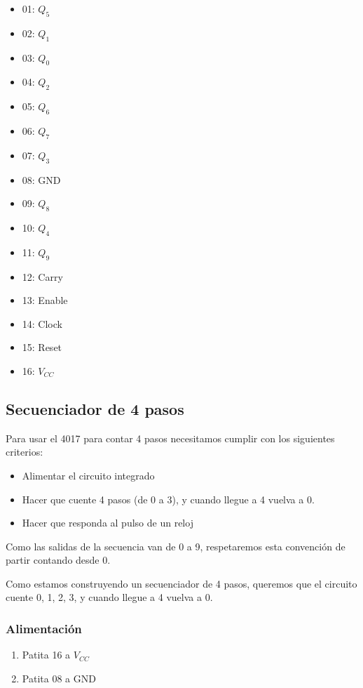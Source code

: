 \documentclass[../principal.tex]{subfiles}
\begin{document}
\begin{itemize}
    \item 01: $Q_{5}$
    \item 02: $Q_{1}$
    \item 03: $Q_{0}$
    \item 04: $Q_{2}$
    \item 05: $Q_{6}$
    \item 06: $Q_{7}$
    \item 07: $Q_{3}$
    \item 08: GND
    \item 09: $Q_{8}$
    \item 10: $Q_{4}$
    \item 11: $Q_{9}$
    \item 12: Carry
    \item 13: Enable
    \item 14: Clock
    \item 15: Reset
    \item 16: $V_{CC}$
\end{itemize}

\subsection{Secuenciador de 4 pasos}

Para usar el 4017 para contar 4 pasos necesitamos cumplir con los siguientes criterios:

\begin{itemize}
    \item Alimentar el circuito integrado
    \item Hacer que cuente 4 pasos (de 0 a 3), y cuando llegue a 4 vuelva a 0.
    \item Hacer que responda al pulso de un reloj
\end{itemize}

Como las salidas de la secuencia van de 0 a 9, respetaremos esta convención de partir contando desde 0.

Como estamos construyendo un secuenciador de 4 pasos, queremos que el circuito cuente 0, 1, 2, 3, y cuando llegue a 4 vuelva a 0.

\subsubsection{Alimentación}

\begin{enumerate}
    \item Patita 16 a $V_{CC}$
    \item Patita 08 a GND
\end{enumerate}
\end{document}
